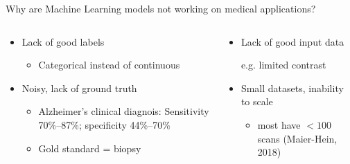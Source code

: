 \documentclass[8pt,xcolor=table]{beamer}
\begin{document}
\begin{frame}{Why are Machine Learning models not working on medical applications?}

\vspace{-4em}


\begin{columns}[t]
\begin{column}{0.5\textwidth}
\centering

\begin{itemize}
\item Lack of good labels
\begin{itemize}
 \item Categorical instead of continuous
\end{itemize}

 \vspace{2em}
 
 \item Noisy, lack of ground truth
\begin{itemize}
    \item Alzheimer's clinical diagnois: Sensitivity 70\%--87\%; specificity 44\%--70\%  
    \item Gold standard = biopsy
\end{itemize}
\vo 



\end{itemize}


\end{column}
\begin{column}{0.5\textwidth}
\centering

\begin{itemize}
\item Lack of good input data

\begin{center}
\small{e.g. limited contrast}
\end{center}

\vspace{2em}

\item Small datasets, inability to scale 

\begin{itemize}
\item most have  $<100$ scans (Maier-Hein, 2018)
\end{itemize}


\end{itemize}


\end{column}
\end{columns}

 
 
\end{frame}
\end{document}
